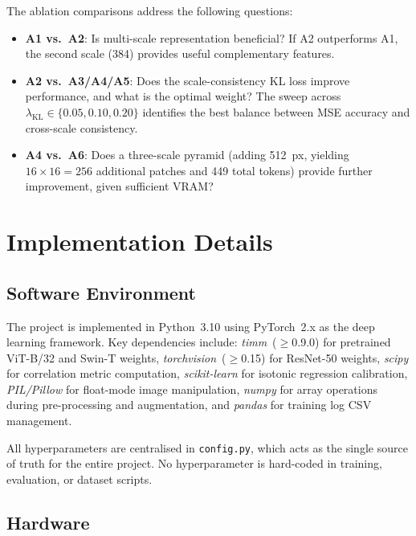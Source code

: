 \noindent
The ablation comparisons address the following questions:
\begin{itemize}
    \item \textbf{A1 vs.\ A2}: Is multi-scale representation beneficial? If A2
          outperforms A1, the second scale (384) provides useful complementary features.
    \item \textbf{A2 vs.\ A3/A4/A5}: Does the scale-consistency KL loss improve
          performance, and what is the optimal weight? The sweep across
          $\lambda_{\text{KL}} \in \{0.05, 0.10, 0.20\}$ identifies the best balance
          between MSE accuracy and cross-scale consistency.
    \item \textbf{A4 vs.\ A6}: Does a three-scale pyramid (adding 512~px,
          yielding $16 \times 16 = 256$ additional patches and 449 total tokens) provide
          further improvement, given sufficient VRAM?
\end{itemize}


\section{Implementation Details}
\label{sec:implementation}

\subsection{Software Environment}

The project is implemented in Python~3.10 using PyTorch~2.x as the deep learning
framework. Key dependencies include:
\textit{timm}~($\geq$0.9.0) for pretrained ViT-B/32 and Swin-T weights,
\textit{torchvision}~($\geq$0.15) for ResNet-50 weights,
\textit{scipy} for correlation metric computation,
\textit{scikit-learn} for isotonic regression calibration,
\textit{PIL/Pillow} for float-mode image manipulation,
\textit{numpy} for array operations during pre-processing and augmentation, and
\textit{pandas} for training log CSV management.

All hyperparameters are centralised in \texttt{config.py}, which acts as the single
source of truth for the entire project. No hyperparameter is hard-coded in training,
evaluation, or dataset scripts.

\subsection{Hardware}

